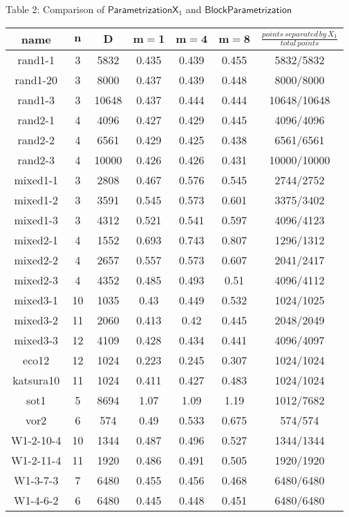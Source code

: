 \documentclass[12pt]{article}
\newcommand{\mainalgoname}{\mathsf{ BlockParametrization}}
\begin{document}
\begin{center}
Table 2: Comparison of $\mathsf{ParametrizationX}_1$ and $\mainalgoname$
\begin{tabular}{c|c|c|c|c|c|c}
\textbf{name}& $\bm{n}$ & $\bm{D}$ & $\bm{m = 1}$ & $\bm{m = 4}$ & $\bm{m = 8}$&$\frac{points\,separated\,by\,X_1}{total\,points}$\\
\hline
rand1-1&3 &5832&0.435&0.439&0.455&5832/5832\\
rand1-20&3 &8000&0.437&0.439&0.448&8000/8000\\
rand1-3&3 &10648&0.437&0.444&0.444&10648/10648\\
rand2-1&4 &4096&0.427&0.429&0.445&4096/4096\\
rand2-2&4 &6561&0.429&0.425&0.438&6561/6561\\
rand2-3&4 &10000&0.426&0.426&0.431&10000/10000\\
mixed1-1&3 &2808&0.467&0.576&0.545& 2744/2752\\
mixed1-2&3 &3591&0.545&0.573&0.601& 3375/3402\\
mixed1-3&3 &4312&0.521&0.541&0.597& 4096/4123\\
mixed2-1&4 &1552&0.693&0.743&0.807& 1296/1312\\
mixed2-2&4 &2657&0.557&0.573&0.607& 2041/2417\\
mixed2-3&4 &4352&0.485&0.493&0.51& 4096/4112\\
mixed3-1&10 &1035&0.43&0.449&0.532& 1024/1025\\
mixed3-2&11 &2060&0.413&0.42&0.445& 2048/2049\\
mixed3-3&12 &4109&0.428&0.434&0.441& 4096/4097\\
eco12&12 &1024&0.223&0.245&0.307&1024/1024\\
katsura10&11 &1024&0.411&0.427&0.483&1024/1024\\
sot1&5 &8694&1.07&1.09&1.19 & 1012/7682\\
vor2&6 &574&0.49&0.533&0.675&574/574\\
W1-2-10-4&10 &1344&0.487&0.496&0.527&1344/1344\\
W1-2-11-4&11 &1920&0.486&0.491&0.505&1920/1920\\
W1-3-7-3&7 &6480&0.455&0.456&0.468&6480/6480\\
W1-4-6-2&6 &6480&0.445&0.448&0.451&6480/6480
\end{tabular}
\end{center}



\end{document}
